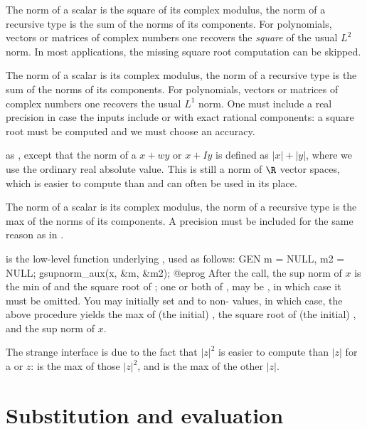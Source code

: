  The norm of a scalar is the square of its complex
modulus, the norm of a recursive type is the sum of the norms of its components.
For polynomials, vectors or matrices of complex numbers one recovers the
\emph{square} of the usual $L^2$ norm. In most applications, the missing square
root computation can be skipped.

 The norm of a scalar is its complex
modulus, the norm of a recursive type is the sum of the norms of its components.
For polynomials, vectors or matrices of complex numbers one recovers
the usual $L^1$ norm. One must include a real precision  in case
the inputs include  or  with exact rational components:
a square root must be computed and we must choose an accuracy.

 as , except that the norm
of a  $x + wy$ or  $x + Iy$ is defined as
$|x| + |y|$, where we use the ordinary real absolute value. This is still a norm
of $\R$ vector spaces, which is easier to compute than
 and can often be used in its place.

 The norm of a scalar is its complex
modulus, the norm of a recursive type is the max of the norms of its
components. A precision  must be included for the same reason as in
.

is the low-level function underlying
, used as follows:
\bprog
  GEN m = NULL, m2 = NULL;
  gsupnorm_aux(x, &m, &m2);
@eprog
After the call, the sup norm of $x$ is the min of  and the square root
of ;  one or both of ,  may be , in
which case it must be omitted. You may initially set  and  to
non- values, in which case, the above procedure yields the max of
(the initial) , the square root of (the initial) , and the sup
norm of $x$.

The strange interface is due to the fact that $|z|^2$ is easier to compute
than $|z|$ for a  or  $z$:  is the max of
those $|z|^2$, and  is the max of the other $|z|$.

\section{Substitution and evaluation}

